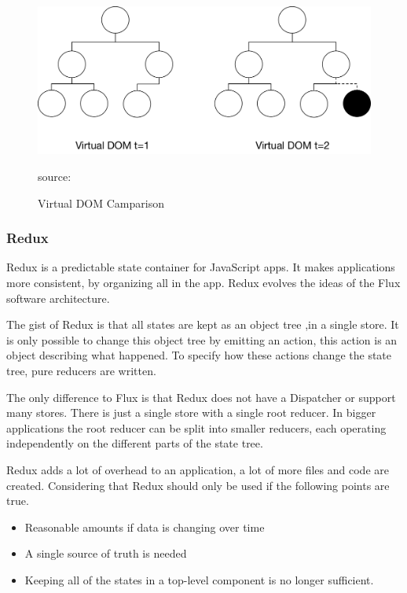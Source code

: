 \begin{figure}[H]
	\centering
	\includegraphics[width=0.8\linewidth]{bilder/grundlagen/VirtualDom.png}
	\caption{Virtual DOM Camparison} source:\cite{Component}
	\label{fig:COMPONENT}
\end{figure}

\subsubsection{Redux}
Redux is a predictable state container for JavaScript apps. It makes applications more consistent, by organizing all in the app. Redux evolves the ideas of the Flux software architecture.
 
The gist of Redux is that all states are kept as an object tree ,in a single store. It is only possible to change this object tree by emitting an action, this action is an object describing what happened. To specify how these actions change the state tree, pure reducers are written.

The only difference to Flux is that Redux does not have a Dispatcher or support many stores. There is just a single store with a single root reducer. In bigger applications the root reducer can be split into smaller reducers, each operating independently on the different parts of the state tree. 

Redux adds a lot of overhead to an application, a lot of more files and code are created. Considering that Redux should only be used if the following points are true. 

\begin{itemize}
\item Reasonable amounts if data is changing over time
\item A single source of truth is needed
\item Keeping all of the states in a top-level component is no longer sufficient.
\end{itemize}




